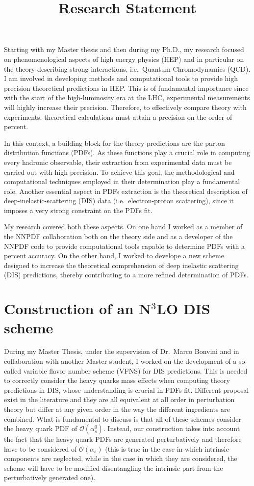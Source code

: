 \documentclass[11pt,a4paper]{moderncv}        %
\title{Research Statement}
\begin{document}
\makecvtitle

Starting with my Master thesis and then during my Ph.D., my research focused on phenomenological aspects of high energy physics (HEP)
and in particular on the theory describing strong interactions, i.e.\ Quantum Chromodynamics (QCD).
I am involved in developing methods and computational tools to provide high precision theoretical predictions in HEP.
This is of fundamental importance since with the start of the high-luminosity era at the LHC, experimental measurements will highly 
increase their precision.
Therefore, to effectively compare theory with experiments, theoretical calculations must attain a precision on the order of percent.

In this context, a building block for the theory predictions are the parton distribution functions (PDFs).
As these functions play a crucial role in computing every hadronic observable, their extraction from
experimental data must be carried out with high precision.
To achieve this goal, the methodological and computational techniques employed in their determination play a fundamental role. 
Another essential aspect in PDFs extraction is the theoretical description of deep-inelastic-scattering (DIS) data (i.e.\ electron-proton
scattering), since it imposes a very strong constraint on the PDFs fit.

My research covered both these aspects.
On one hand I worked as a member of the NNPDF collaboration both on the theory side and as a developer of the NNPDF code to provide
computational tools capable to determine PDFs with a percent accuracy.
On the other hand, I worked to develope a new scheme designed to increase the theoretical comprehension of deep inelastic scattering
(DIS) predictions, thereby contributing to a more refined determination of PDFs.

\section{Construction of an N$^3$LO DIS scheme}

During my Master Thesis, under the supervision of Dr.\ Marco Bonvini and in collaboration with another Master student,
I worked on the development of a so-called variable flavor number scheme (VFNS) for DIS predictions.
This is needed to correctly consider the heavy quarks mass effects when computing theory predictions in DIS,
whose understanding is crucial in PDFs fit.
Different proposal exist in the literature and they are all equivalent at all order in perturbation theory but differ at any given
order in the way the different ingredients are combined.
What is fundamental to discuss is that all of these schemes consider the heavy quark PDF of $\mathcal{O}(\alpha_s^0)$.
Instead, our construction takes into account the fact that the heavy quark PDFs are generated
perturbatively and therefore have to be considered of $\mathcal{O}(\alpha_s)$ (this is true in the case in which intrinsic components
are neglected, while in the case in which they are considered, the scheme will
have to be modified disentangling the intrinsic part from the perturbatively generated one).
\end{document}
